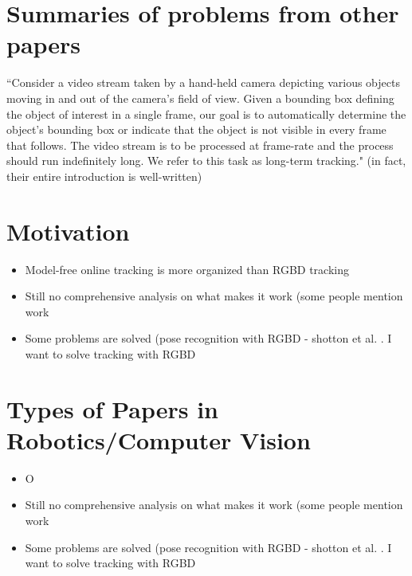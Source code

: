 \section{Summaries of problems from other papers}
``Consider a video stream taken by a hand-held camera depicting various objects moving in and out of the camera’s field of
view. Given a bounding box defining the object of interest
in a single frame, our goal is to automatically determine
the object’s bounding box or indicate that the object is not
visible in every frame that follows. The video stream is to be
processed at frame-rate and the process should run indefinitely
long. We refer to this task as long-term tracking." \cite{kalal2012tracking} (in fact, their entire introduction is well-written)

\section{Motivation}
\begin{itemize}
  \item Model-free online tracking is more organized than RGBD tracking
  \item Still no comprehensive analysis on what makes it work (some people mention work
  \item Some problems are solved (pose recognition with RGBD - shotton et al. \cite{shotton2013real}. I want to solve tracking with RGBD
\end{itemize}


\section{Types of Papers in Robotics/Computer Vision}
\begin{itemize}
  \item O
  \item Still no comprehensive analysis on what makes it work (some people mention work
  \item Some problems are solved (pose recognition with RGBD - shotton et al. \cite{shotton2013real}. I want to solve tracking with RGBD
\end{itemize}



